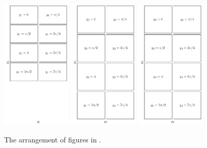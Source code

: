 \begin{figure}
	\begin{center}
		\includegraphics[width=0.3\textwidth]{chp04_paper_numerics/figures/gabc/S2_slices_yz_key}
		\includegraphics[width=0.3\textwidth]{chp04_paper_numerics/figures/gabc/S2_slices_xz_key}
		\includegraphics[width=0.3\textwidth]{chp04_paper_numerics/figures/gabc/S2_slices_xy_key}
		\caption{The arrangement of figures in .}
		\label{fig:gabc_S2_key}
	\end{center}
\end{figure}

